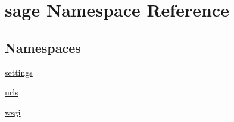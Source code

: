 \hypertarget{a00041}{}\section{sage Namespace Reference}
\label{a00041}
\subsection*{Namespaces}
\begin{DoxyCompactItemize}
\item 
 \hyperlink{a00043}{settings}
\item 
 \hyperlink{a00044}{urls}
\item 
 \hyperlink{a00045}{wsgi}
\end{DoxyCompactItemize}
